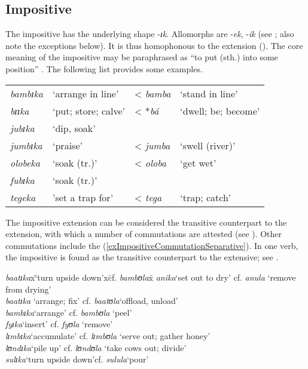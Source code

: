 
\subsection{Impositive}\label{Impositive}
The impositive has the underlying shape -\textit{ɪk}. Allomorphs are -\textit{ek}, -\textit{ik} (see ; also note the exceptions below). It is thus homophonous to the  extension (). The core meaning of the impositive may be paraphrased as ``to put (sth.) into some position'' \citep[73]{SchadebergT2003a}. The following list provides some examples.

\begin{exe}
\ex\label{exImpositive}
\begin{tabular}[t]{llll} 
\textit{bambɪka}&`arrange in line'& < \textit{bamba}& \lq stand in line'\\
\textit{bɪɪka}&`put; store; calve'& < *\textit{bá}&`dwell; be; become'\\
\textit{jubɪka}&`dip, soak'\\
\textit{jumbɪka}&`praise'& < \textit{jumba}& `swell (river)'\\
\textit{olobeka}&`soak (tr.)'& < \textit{oloba}& `get wet'\\
\textit{fubɪka}&`soak (tr.)'&& %
\\\textit{tegeka}&'set a trap for'& < \textit{tega}&`trap; catch'
\end{tabular}
\end{exe}

The impositive extension can be considered the transitive counterpart to the  extension, with which a number of commutations are attested (see ). Other commutations include the  (\ref{exImpositiveCommutationSeparative}). In one verb, the impositive is found as the transitive counterpart to the extensive; see .
\begin{exe}
\ex \label{exImpositiveCommutationSeparative}
\begin{tabbing}
\textit{baatɪka}x\=\lq turn upside down'x\=cf. \textit{bambʊla}x\=\kill %
\textit{anika}\>`set out to dry' \> cf. \textit{anula} \>`remove from drying'\\
\textit{baatɪka} \> `arrange; fix' \> cf. \textit{baatʊla}\>`offload, unload'\\
\textit{bambɪka}\>`arrange' \> cf. \textit{bambʊla} \> `peel'\\
\textit{fyɪka}\>`insert' \> cf. \textit{fyʊla} \> `remove'\\
\textit{lɪmbɪka}\>`accumulate' \> cf. \textit{lɪmbʊla} \> `serve out; gather honey'\\
\textit{lʊndɪka}\>`pile up' \> cf. \textit{lʊndʊla} \> `take cows out; divide'\\
\textit{sulɪka}\>`turn upside down'\>cf. \textit{sulula}\>`pour'
\end{tabbing}
\end{exe}%

